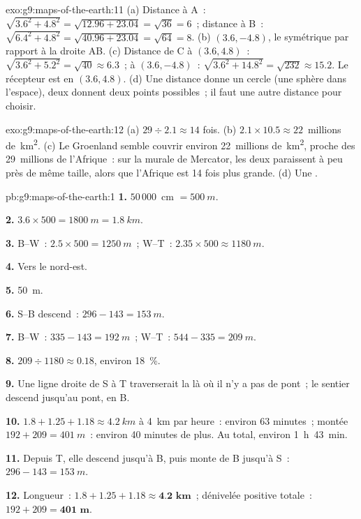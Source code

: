 \begin{solution}{exo:g9:maps-of-the-earth:11}
(a) Distance à A~: $\sqrt{3.6^2 + 4.8^2} = \sqrt{12.96 + 23.04} =
\sqrt{36} = 6$~; distance à B~: $\sqrt{6.4^2 + 4.8^2} = \sqrt{40.96 +
23.04} = \sqrt{64} = 8$. (b) $(3.6, -4.8)$, le symétrique par rapport à
la droite AB. (c) Distance de C à $(3.6, 4.8)$~: $\sqrt{3.6^2 + 5.2^2} =
\sqrt{40} \approx 6.3$~; à $(3.6, -4.8)$~: $\sqrt{3.6^2 + 14.8^2} =
\sqrt{232} \approx 15.2$. Le récepteur est en $(3.6, 4.8)$. (d) Une
distance donne un cercle (une sphère dans l'espace), deux donnent deux
points possibles~; il faut une autre distance pour choisir.
\end{solution}

\begin{solution}{exo:g9:maps-of-the-earth:12}
(a) $29 \div 2.1 \approx 14$ fois. (b) $2.1 \times 10.5 \approx
22$~millions de~\unit{km^2}. (c) Le Groenland semble couvrir environ
22~millions de~\unit{km^2}, proche des 29~millions de l'Afrique~: sur la
 murale de Mercator, les deux paraissent à peu près de même taille,
alors que l'Afrique est 14 fois plus grande. (d) Une .
\end{solution}

\begin{solution}{pb:g9:maps-of-the-earth:1}
\textbf{1.} $50\,000$~cm $= \qty{500}{m}$.

\textbf{2.} $3.6 \times 500 = \qty{1800}{m} = \qty{1.8}{km}$.

\textbf{3.} B--W~: $2.5 \times 500 = \qty{1250}{m}$~; W--T~: $2.35 \times 500
\approx \qty{1180}{m}$.

\textbf{4.} Vers le nord-est.

\textbf{5.} \qty{50}{m}.

\textbf{6.} S--B descend~: $296 - 143 = \qty{153}{m}$.

\textbf{7.} B--W~: $335 - 143 = \qty{192}{m}$~; W--T~: $544 - 335 =
\qty{209}{m}$.

\textbf{8.} $209 \div 1180 \approx 0.18$, environ \qty{18}{\%}.

\textbf{9.} Une ligne droite de S à T traverserait la  là où il n'y
a pas de pont~; le sentier descend jusqu'au pont, en B.

\textbf{10.} $1.8 + 1.25 + 1.18 \approx \qty{4.2}{km}$ à \qty{4}{km} par
heure~: environ 63 minutes~; montée $192 + 209 = \qty{401}{m}$~: environ
40 minutes de plus. Au total, environ 1~h~43~min.

\textbf{11.} Depuis T, elle descend jusqu'à B, puis monte de B jusqu'à S~: $296 -
143 = \qty{153}{m}$.

\textbf{12.} Longueur~: $1.8 + 1.25 + 1.18 \approx \textbf{4.2 km}$~;
dénivelée positive totale~: $192 + 209 = \textbf{401 m}$.
\end{solution}
